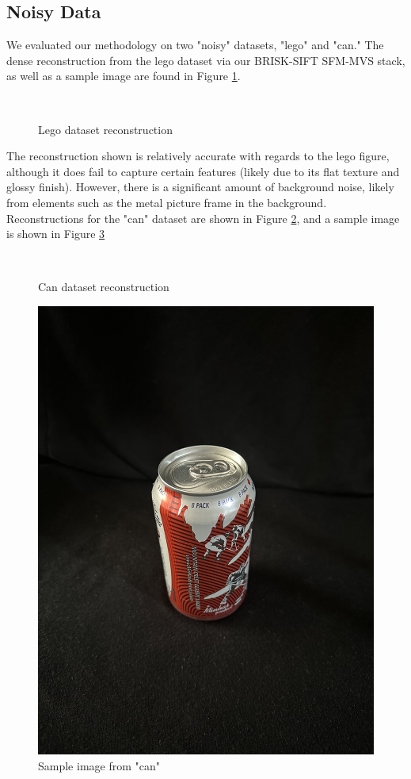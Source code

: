 \documentclass[conference,compsoc]{IEEEtran}
\begin{document}
\subsection{Noisy Data}
We evaluated our methodology on two "noisy" datasets, "lego" and "can."
The dense reconstruction from the lego dataset via 
our BRISK-SIFT SFM-MVS stack, as well as a sample image are found in 
Figure \ref{fig:lego_recn}.
\begin{figure}
    \centering
    \
    \caption{Lego dataset reconstruction}
    \label{fig:lego_recn}
\end{figure}
The reconstruction shown is relatively accurate with regards to the lego figure,
although it does fail to capture certain features (likely due to 
its flat texture and glossy finish). However, there is a significant amount of 
background noise, likely from elements such as the metal picture frame in the background.
\\
Reconstructions for the "can" dataset are shown in Figure \ref{fig:can_n}, and a sample 
image is shown in Figure \ref{fig:can_n_sampl}
\begin{figure}
    \centering
    \
    \caption{Can dataset reconstruction}
    \label{fig:can_n}
\end{figure}
\begin{figure}
    \centering
    \includegraphics[width=.2\textwidth]{figures/can/sample.jpeg}
    \caption{Sample image from "can"}
    \label{fig:can_n_sampl}
\end{figure}
\end{document}
